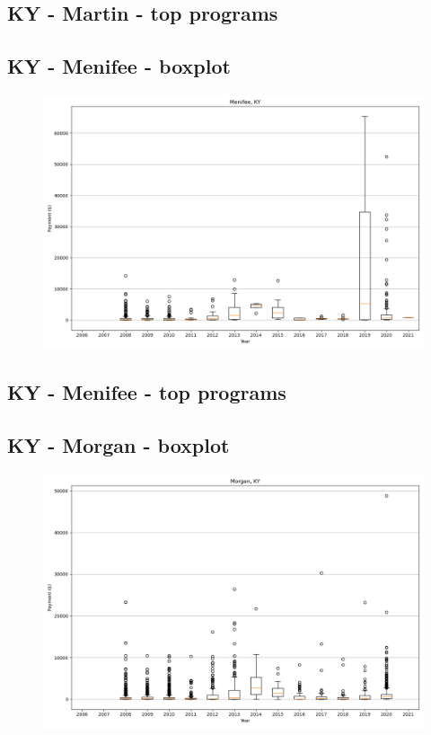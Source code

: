 \subsection*{KY - Martin - top programs}

\newpage
\subsection*{KY - Menifee - boxplot}
\begin{figure}[h]
\centering
\includegraphics[width=7in]{../output/boxplots/counties/Menifee-KY_boxplot.png}
\end{figure}


\subsection*{KY - Menifee - top programs}

\newpage
\subsection*{KY - Morgan - boxplot}
\begin{figure}[h]
\centering
\includegraphics[width=7in]{../output/boxplots/counties/Morgan-KY_boxplot.png}
\end{figure}


